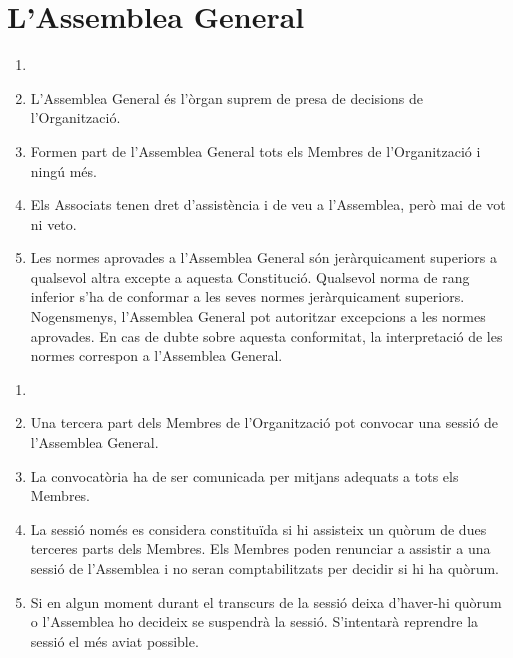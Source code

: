 \documentclass[12pt]{article}
\begin{document}
\section{L'Assemblea General}

\begin{art}
    \begin{enumerate}[1.]
        \item[]
        \item L'Assemblea General és l'òrgan suprem de presa de decisions de l'Organització.
        \item Formen part de l'Assemblea General tots els Membres de l'Organització i ningú més.
        \item Els Associats tenen dret d'assistència i de veu a l'Assemblea, però mai de vot ni veto.
        \item Les normes aprovades a l'Assemblea General són jeràrquicament superiors a qualsevol altra excepte a aquesta Constitució. Qualsevol norma de rang inferior s'ha de conformar a les seves normes jeràrquicament superiors. Nogensmenys, l'Assemblea General pot autoritzar excepcions a les normes aprovades. En cas de dubte sobre aquesta conformitat, la interpretació de les normes correspon a l'Assemblea General.
    \end{enumerate}
\end{art}

\begin{art}
    \begin{enumerate}[1.]
        \item[]
        \item Una tercera part dels Membres de l'Organització pot convocar una sessió de l'Assemblea General.
        \item La convocatòria ha de ser comunicada per mitjans adequats a tots els Membres.
        \item La sessió només es considera constituïda si hi assisteix un quòrum de dues terceres parts dels Membres. Els Membres poden renunciar a assistir a una sessió  de l'Assemblea i no seran comptabilitzats per decidir si hi ha quòrum.
        \item Si en algun moment durant el transcurs de la sessió deixa d'haver-hi quòrum o l'Assemblea ho decideix se suspendrà la sessió. S'intentarà reprendre la sessió el més aviat possible.
    \end{enumerate}
\end{art}
\end{document}

